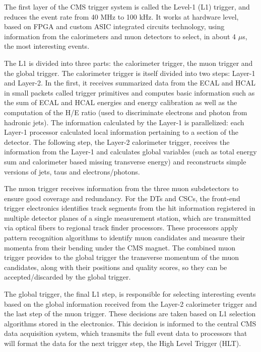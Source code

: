 The first layer of the CMS trigger system is called the Level-1 (L1) trigger, and reduces the event rate from 40 MHz to 100 kHz. 
It works at hardware level, based on FPGA and custom ASIC integrated circuits technology, using information from the calorimeters and muon detectors to select, in about 4 $\mu$s, the most interesting events. 

The L1 is divided into three parts: the calorimeter trigger, the muon trigger and the global trigger.
The calorimeter trigger is itself divided into two steps: Layer-1 and Layer-2. 
In the first, it receives summarized data from the ECAL and HCAL in small packets called trigger primitives and computes basic information such as the sum of ECAL and HCAL energies and energy calibration as well as the computation of the H/E ratio (used to discriminate electrons and photon from hadronic jets). 
The information calculated by the Layer-1 is parallelized: each Layer-1 processor calculated local information pertaining to a section of the detector. 
The following step, the Layer-2 calorimeter trigger, receives the information from the Layer-1 and calculates global variables (such as total energy sum and calorimeter based missing transverse energy) and reconstructs simple versions of jets, taus and electrons/photons. 

The muon trigger receives information from the three muon subdetectors to ensure good coverage and redundancy. 
For the DTs and CSCs, the front-end trigger electronics identifies track segments from the hit information registered in multiple detector planes of a single measurement station, which are transmitted via optical fibers to regional track finder processors. 
These processors apply pattern recognition algorithms to identify muon candidates and measure their momenta from their bending under the CMS magnet. 
The combined muon trigger provides to the global trigger the transverse momentum of the muon candidates, along with their positions and quality scores, so they can be accepted/discarded by the global trigger. 

The global trigger, the final L1 step, is responsible for selecting interesting events based on the global information received from the Layer-2 calorimeter trigger and the last step of the muon trigger. 
These decisions are taken based on L1 selection algorithms stored in the electronics. 
This decision is informed to the central CMS data acquisition system, which transmits the full event data to processors that will format the data for the next trigger step, the High Level Trigger (HLT). 

